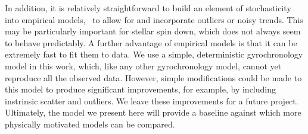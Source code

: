 In addition, it is relatively straightforward to build an element of
stochasticity into empirical models, \ie\ to allow for and incorporate
outliers or noisy trends.
This may be particularly important for stellar spin down, which does not
always seem to behave predictably.
A further advantage of empirical models is that it can be extremely fast to
fit them to data.
We use a simple, deterministic gyrochronology model in this work, which, like
any other gyrochronology model, cannot yet reproduce all the observed data.
However, simple modifications could be made to this model to produce
significant improvements, for example, by including instrinsic scatter and
outliers.
We leave these improvements for a future project.
Ultimately, the model we present here will provide a baseline against which
more physically motivated models can be compared.


